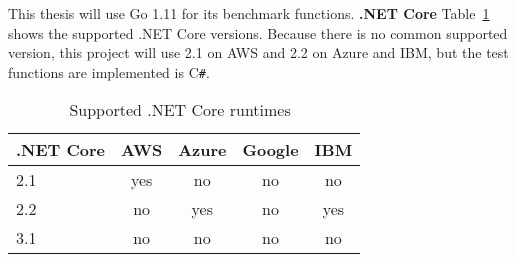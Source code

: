  This thesis will use Go 1.11 for its benchmark functions.
\textbf{.NET Core}
Table~\ref{table:dotnet} shows the supported .NET Core versions.
Because there is no common supported version, this project will use 2.1 on \gls{AWS} and 2.2 on Azure and \gls{IBM}, but the test functions are implemented is C\texttt{\#}.

\begin{table}[!t]
\centering
\captionsetup[table]{justification=centering, labelfont=bf}
\begin{tabular}{l|c|c|c|c} 
 .NET Core & AWS & Azure & Google & IBM \\ \hline
2.1  & \cellcolor{green!25}yes    & \cellcolor{red!25}no    & \cellcolor{red!25}no  & \cellcolor{red!25}no\\ \hline
2.2  & \cellcolor{red!25}no    & \cellcolor{green!25}yes    & \cellcolor{red!25}no  & \cellcolor{green!25}yes\\ \hline
3.1  & \cellcolor{red!25}no    & \cellcolor{red!25}no    & \cellcolor{red!25}no  & \cellcolor{red!25}no\\ \hline
\end{tabular}
\caption[Supported .NET Core runtimes]{Supported .NET Core runtimes~\cite{AWSLambdaLanguages, AzureFunctionsLanguages, GoogleFunctionsLanguages, IBMRuntimes}}
\label{table:dotnet}
\end{table}

